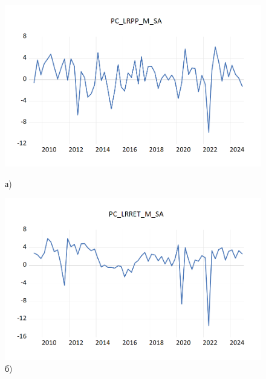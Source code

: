 \documentclass[a4paper, 14pt]{extreport}
\numberwithin{equation}{section}
\numberwithin{equation}{section}
\begin{document}
		\begin{figure}[h!]
		\centering
		\begin{minipage}{0.5\textwidth}
			\centering
			\includegraphics[scale=0.4]{images/image29}
			\caption*{а)}
		\end{minipage}%
		\begin{minipage}{0.5\textwidth}
			\centering
			\includegraphics[scale=0.4]{images/image30}
			\caption*{б)}
		\end{minipage}%
		

\end{figure}
\end{document}
